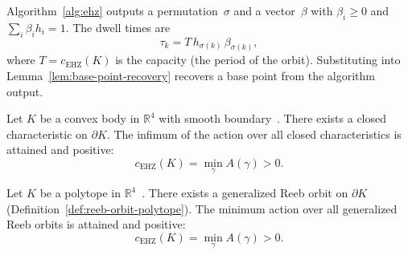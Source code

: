 \begin{remark}\label{rem:beta-to-tau}
Algorithm~\ref{alg:ehz} outputs a permutation~$\sigma$ and
a vector~$\beta$ with $\beta_i \geq 0$ and
$\sum_i \beta_i h_i = 1$.
The dwell times are
\begin{equation}\label{eq:beta-to-tau}
  \tau_k = T\, h_{\sigma(k)}\, \beta_{\sigma(k)},
\end{equation}
where $T = c_{\mathrm{EHZ}}(K)$ is the capacity
(the period of the orbit).
Substituting into Lemma~\ref{lem:base-point-recovery}
recovers a base point from the algorithm output.
\end{remark}

\begin{theorem}\label{thm:orbit-existence-smooth}
Let $K$ be a convex body in $\mathbb{R}^4$ with smooth boundary~\cite{Rabinowitz1978}.
There exists a closed characteristic on $\partial K$.
The infimum of the action over all closed characteristics
is attained and positive:
\[
  c_{\mathrm{EHZ}}(K) = \min_{\gamma} A(\gamma) > 0.
\]
\end{theorem}

\begin{theorem}\label{thm:orbit-existence-polytope}
Let $K$ be a polytope in $\mathbb{R}^4$~\cite{AAO2014}.
There exists a generalized Reeb orbit on $\partial K$
(Definition~\ref{def:reeb-orbit-polytope}).
The minimum action over all generalized Reeb orbits is attained
and positive:
\[
  c_{\mathrm{EHZ}}(K) = \min_{\gamma} A(\gamma) > 0.
\]
\end{theorem}


